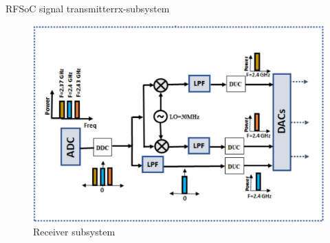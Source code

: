 \begin{frame}{RFSoC signal transmitter}{rx-subsystem}
	\begin{figure}
		\centering
		\includegraphics[scale=1]{graphics/rx_ss.png}
		\caption{Receiver subsystem}
	\end{figure}
\end{frame}
